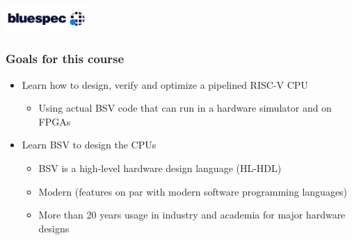 



\date{L1: Introduction}





\begin{frame}
 \titlepage

 \begin{center}
  \includegraphics[height=1cm]{../Figures/Bluespec_Logo_2022-10}
 \end{center}
\end{frame}



\begin{frame}
\frametitle{Goals for this course}

\begin{itemize}
\item Learn how to design, verify and optimize a pipelined RISC-V CPU
  \begin{itemize}
  \item Using actual BSV code that can run in a hardware simulator and on FPGAs
  \end{itemize}

\pause

\item Learn BSV to design the CPUs
  \begin{itemize}
  \item BSV is a high-level hardware design language (HL-HDL)
  \item Modern (features on par with modern software programming languages)
  \item More than 20 years usage in industry and academia for major hardware designs
  \end{itemize}
\end{itemize}

\vfill

\end{frame}

